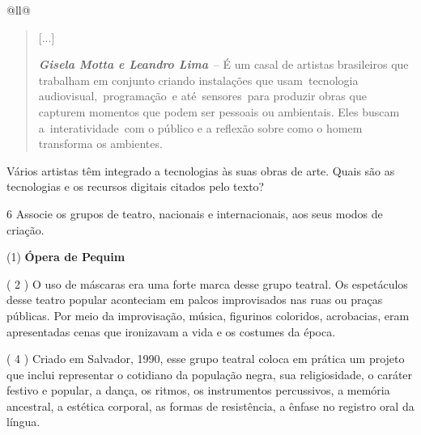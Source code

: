 \begin{itemize}
\begin{itemize}
\begin{escolha}[]{@{}ll@{}}
\begin{quote}
{[}...{]}

\emph{\textbf{Gisela Motta e Leandro Lima}}~-- É um casal de artistas
brasileiros que trabalham em conjunto criando instalações que
usam~tecnologia audiovisual,~programação~e até~sensores~para produzir
obras que capturem momentos que podem ser pessoais ou ambientais. Eles
buscam a~interatividade~com o público e a reflexão sobre como o homem
transforma os ambientes.

\end{quote}

Vários artistas têm integrado a tecnologias às suas obras de arte. Quais
são as tecnologias e os recursos digitais citados pelo texto?


\num{6} Associe os grupos de teatro, nacionais e internacionais, aos seus modos de criação.

(1)  \textbf{Ópera de Pequim}


( 2 ) O uso de máscaras era uma forte marca desse grupo teatral. Os
espetáculos desse teatro popular aconteciam em palcos improvisados nas
ruas ou praças públicas. Por meio da improvisação, música, figurinos
coloridos, acrobacias, eram apresentadas cenas que ironizavam a vida e
os costumes da época.


( 4 ) Criado em Salvador, 1990, esse grupo teatral coloca em prática um
projeto que inclui representar o cotidiano da população negra, sua
religiosidade, o caráter festivo e popular, a dança, os ritmos, os
instrumentos percussivos, a memória ancestral, a estética corporal, as
formas de resistência, a ênfase no registro oral da língua.


\end{escolha}
\end{itemize}
\end{itemize}
